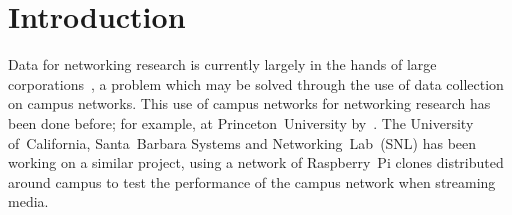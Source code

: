 \section{Introduction}\label{introduction}
    Data for networking research is currently largely in the hands of large corporations~\autocite{GuptaArpit2019AEtD}, a problem which may be solved through the use of data collection on campus networks. This use of campus networks for networking research has been done before; for example, at Princeton~University by~\textcite{KimHyojoon2021Erop}. The University of~California, Santa~Barbara Systems and Networking~Lab~(SNL) has been working on a similar project, using a network of Raspberry~Pi clones distributed around campus to test the performance of the campus network when streaming media.
